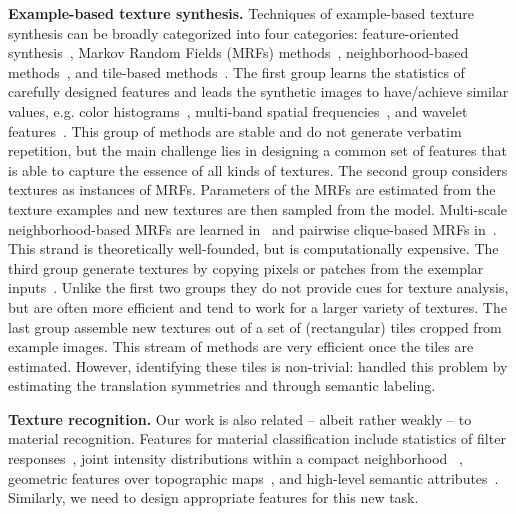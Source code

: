 \documentclass[10pt,twocolumn,letterpaper]{article}
\begin{document}
\textbf{Example-based texture synthesis.}  Techniques of example-based
texture synthesis can be broadly categorized into four categories:
feature-oriented synthesis~\cite{Heeger:95, Debonet:97,
  Portilla:2000:IJCV, random:phase}, Markov Random Fields (MRFs)
methods~\cite{paget:tip98, zhu:frame, Zalesny05}, neighborhood-based
methods~\cite{Efros:sig2001, Kwatra:2003, Kwatra:tog:2005,
  dai:facade:iccv13}, and tile-based methods~\cite{Cohen:2003:wang,
  Liu:2004:NTA}.  The first group learns the statistics of carefully
designed features and leads the synthetic images to have/achieve
similar values, e.g. color histograms~\cite{Heeger:95}, multi-band
spatial frequencies~\cite{Debonet:97}, and wavelet
features~\cite{Portilla:2000:IJCV}. This group of methods are stable
and do not generate verbatim repetition, but the main challenge lies
in designing a common set of features that is able to capture the
essence of all kinds of textures.  The second group considers textures
as instances of MRFs. Parameters of the MRFs are estimated from the
texture examples and new textures are then sampled from the
model. Multi-scale neighborhood-based MRFs are learned
in~\cite{paget:tip98} and pairwise clique-based MRFs
in~\cite{Zalesny05}. This strand is theoretically well-founded, but is
computationally expensive. The third group generate textures by
copying pixels or patches from the exemplar inputs~\cite{Efros:1999,
  Efros:sig2001, Kwatra:2003, Kwatra:tog:2005,
  dai:facade:iccv13}. Unlike the first two groups they do not provide
cues for texture analysis, but are often more efficient and tend to
work for a larger variety of textures. The last group assemble new
textures out of a set of (rectangular) tiles cropped from example
images. This stream of methods are very efficient once the tiles are
estimated. However, identifying these tiles is non-trivial:
\cite{liu:ijcv:05} handled this problem by estimating the translation
symmetries and \cite{dai:facade:iccv13} through semantic labeling.

\textbf{Texture recognition.}  Our work is also related -- albeit
rather weakly -- to material recognition. Features for material
classification include statistics of filter
responses~\cite{texton:2001, Manjunath96, Schmid01}, joint intensity
distributions within a compact neighborhood ~\cite{material:pami:09,
  sorted:texture}, geometric features over topographic
maps~\cite{xia:texture}, and high-level semantic
attributes~\cite{semantic:texture}.  Similarly, we need
to design appropriate features for this new task.
\end{document}
